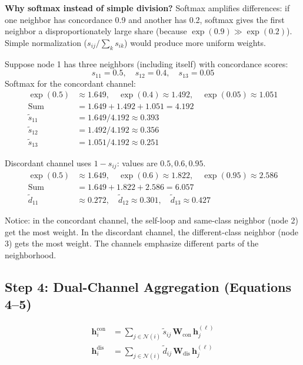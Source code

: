\documentclass[11pt,a4paper]{article}
\newcommand{\N}{\mathcal{N}}
\newcommand{\bW}{\mathbf{W}}
\newcommand{\bh}{\mathbf{h}}
\theoremstyle{definition}
\theoremstyle{plain}
\begin{document}
\textbf{Why softmax instead of simple division?}
Softmax amplifies differences: if one neighbor has concordance 0.9 and
another has 0.2, softmax gives the first neighbor a disproportionately large
share (because $\exp(0.9) \gg \exp(0.2)$).
Simple normalization ($s_{ij} / \sum_k s_{ik}$) would produce more uniform weights.

\begin{example}
Suppose node 1 has three neighbors (including itself) with concordance scores:
\[
  s_{11} = 0.5, \quad s_{12} = 0.4, \quad s_{13} = 0.05
\]
Softmax for the concordant channel:
\begin{align*}
  \exp(0.5) &\approx 1.649, \quad \exp(0.4) \approx 1.492, \quad \exp(0.05) \approx 1.051 \\
  \text{Sum} &= 1.649 + 1.492 + 1.051 = 4.192 \\
  \tilde{s}_{11} &= 1.649/4.192 \approx 0.393 \\
  \tilde{s}_{12} &= 1.492/4.192 \approx 0.356 \\
  \tilde{s}_{13} &= 1.051/4.192 \approx 0.251
\end{align*}

Discordant channel uses $1 - s_{ij}$: values are $0.5, 0.6, 0.95$.
\begin{align*}
  \exp(0.5) &\approx 1.649, \quad \exp(0.6) \approx 1.822, \quad \exp(0.95) \approx 2.586 \\
  \text{Sum} &= 1.649 + 1.822 + 2.586 = 6.057 \\
  \tilde{d}_{11} &\approx 0.272, \quad
  \tilde{d}_{12} \approx 0.301, \quad
  \tilde{d}_{13} \approx 0.427
\end{align*}

Notice: in the concordant channel, the self-loop and same-class neighbor (node 2)
get the most weight.
In the discordant channel, the different-class neighbor (node 3) gets the most weight.
The channels emphasize different parts of the neighborhood.
\end{example}


\subsection{Step 4: Dual-Channel Aggregation (Equations 4--5)}
\label{sec:dual_channel}

\begin{align}
  \bh_i^{\text{con}} &= \sum_{j \in \N(i)} \tilde{s}_{ij}\, \bW_{\text{con}}\, \bh_j^{(\ell)}
  \tag{Eq.~4} \\[6pt]
  \bh_i^{\text{dis}} &= \sum_{j \in \N(i)} \tilde{d}_{ij}\, \bW_{\text{dis}}\, \bh_j^{(\ell)}
  \tag{Eq.~5}
\end{align}
\end{document}

